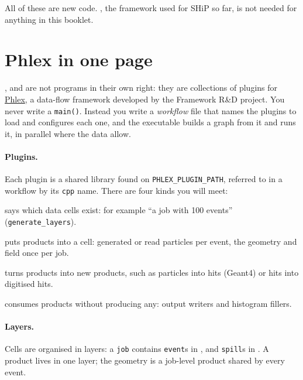 All of these are new code. , the framework used for SHiP so far,
is not needed for anything in this booklet.

\section{Phlex in one page}
\label{sec:phlex}

,  and  are not programs in their own right:
they are collections of plugins for
\href{https://github.com/Framework-R-D/phlex}{Phlex}, a data-flow framework
developed by the Framework R\&D project. You never write a \texttt{main()}. Instead you write a
\emph{workflow} file that names the plugins to load and configures each one,
and the  executable builds a graph from it and runs it, in
parallel where the data allow.

\paragraph{Plugins.} Each plugin is a shared library found on
\texttt{PHLEX\_PLUGIN\_PATH}, referred to in a workflow by its \texttt{cpp}
name. There are four kinds you will meet:

\begin{description}[leftmargin=2.2cm, style=sameline]
  \item[driver]   says which data cells exist: for example ``a job with 100
                  events'' (\texttt{generate\_layers}).
  \item[source / provider] puts products into a cell: generated or read
                  particles per event, the geometry and field once per job.
  \item[transform] turns products into new products, such as particles into
                  hits (Geant4) or hits into digitised hits.
  \item[observer] consumes products without producing any: output writers and
                  histogram fillers.
\end{description}

\paragraph{Layers.} Cells are organised in layers: a \texttt{job} contains
\texttt{event}s in , and \texttt{spill}s in . A product
lives in one layer; the geometry is a job-level product shared by every event.

